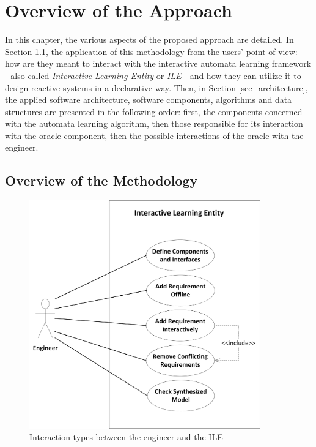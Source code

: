 \chapter{Overview of the Approach}
In this chapter, the various aspects of the proposed approach are detailed. In Section \ref{sec_methodology}, the application of this methodology from the users' point of view: how are they meant to interact with the interactive automata learning framework - also called \textit{Interactive Learning Entity} or \textit{ILE} - and how they can utilize it to design reactive systems in a declarative way. Then, in Section \ref{sec_architecture}, the applied software architecture, software components, algorithms and data structures are presented in the following order: first, the components concerned with the automata learning algorithm, then those responsible for its interaction with the oracle component, then the possible interactions of the oracle with the engineer.
\section{Overview of the Methodology} \label{sec_methodology}
\begin{figure}[!ht] 
	\centering
	
		\includegraphics[width=100mm, keepaspectratio]{figures/methodology_interactiontypes.png}
	\caption{Interaction types between the engineer and the ILE}
	\label{fig_methodology_interactiontypes}
\end{figure}

